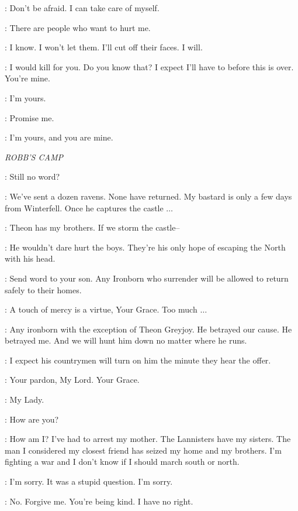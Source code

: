 \SHAE: Don't be afraid. I can take care of myself. 

\TYRION: There are people who want to hurt me. 

\SHAE: I know. I won't let them. I'll cut off their faces. I will. 

\TYRION: I would kill for you. Do you know that? I expect I'll have to before this is over. You're mine. 

\SHAE: I'm yours. 

\TYRION: Promise me. 

\SHAE: I'm yours, and you are mine. 


\scene

\textit{ROBB'S CAMP} 


\ROBB: Still no word? 

\ROOSE: We've sent a dozen ravens. None have returned. My bastard is only a few days from Winterfell. Once he captures the castle $\ldots$  

\ROBB: Theon has my brothers. If we storm the castle--  

\ROOSE: He wouldn't dare hurt the boys. They're his only hope of escaping the North with his head. 

\ROBB: Send word to your son. Any Ironborn who surrender will be allowed to return safely to their homes. 

\ROOSE: A touch of mercy is a virtue, Your Grace. Too much $\ldots$  

\ROBB: Any ironborn with the exception of Theon Greyjoy. He betrayed our cause. He betrayed me. And we will hunt him down no matter where he runs. 

\ROOSE: I expect his countrymen will turn on him the minute they hear the offer. 


\TALISA: Your pardon, My Lord. Your Grace. 

\ROOSE: My Lady. 


\TALISA: How are you? 

\ROBB: How am I? I've had to arrest my mother. The Lannisters have my sisters. The man I considered my closest friend has seized my home and my brothers. I'm fighting a war and I don't know if I should march south or north. 

\TALISA: I'm sorry. It was a stupid question. I'm sorry. 

\ROBB: No. Forgive me. You're being kind. I have no right. 

